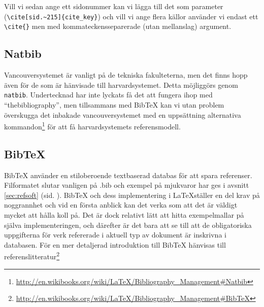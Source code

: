 Vill vi sedan ange ett sidonummer kan vi lägga till det som parameter (\verb?\cite[sid.~215]{cite_key}?) och vill vi ange flera källor använder vi endast ett \verb?\cite{}? men med kommateckensseparerade (utan mellanslag) argument.

\subsection{Natbib}
Vancouversystemet är vanligt på de tekniska fakulteterna, men det finns hopp även för de som är hänvisade till harvardsystemet. Detta möjliggörs genom \verb?natbib?. Undertecknad har inte lyckats få det att fungera ihop med ``thebibliography'', men tillsammans med BibTeX kan vi utan problem överskugga det inbakade vancouversystemet med en uppsättning alternativa kommandon\footnote{\url{http://en.wikibooks.org/wiki/LaTeX/Bibliography_Management\#Natbib}} för att få harvardsystemets referensmodell. 

\subsection{BibTeX}
BibTeX använder en stiloberoende textbaserad databas för att spara referenser. Filformatet slutar vanligen på .bib och exempel på mjukvaror har ges i avsnitt \ref{sec:refsoft} (sid. \pageref{sec:refsoft}). BibTeX och dess implementering i \LaTeX ställer en del krav på noggrannhet och vid en första anblick kan det verka som att det är väldigt mycket att hålla koll på. Det är dock relativt lätt att hitta exempelmallar på själva implementeringen, och därefter är det bara att se till att de obligatoriska uppgifterna för verk refererade i aktuell typ av dokument är inskrivna i databasen. För en mer detaljerad introduktion till BibTeX hänvisas till referenslitteratur\footnote{\url{http://en.wikibooks.org/wiki/LaTeX/Bibliography_Management\#BibTeX}}
